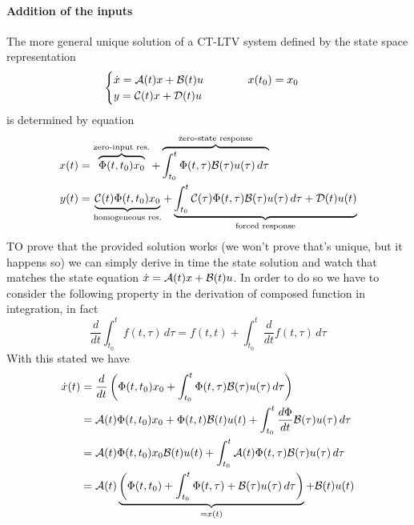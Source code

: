 	\paragraph{Addition of the inputs} The more general unique solution of a CT-LTV system defined by the state space representation
	\[ \begin{cases}
		\dot x = \mathcal{A}(t) x + \mathcal{B}(t) u \hspace{1.4cm} x(t_0) = x_0\\ 
		y = \mathcal{C}(t) x + \mathcal{D}(t) u
	\end{cases} \]
	is determined by equation
	\begin{equation}
	\begin{split}
		x(t) & = \overbrace{\Phi(t,t_0) x_0}^\textrm{zero-input res.} + \overbrace{\int_{t_0}^t \Phi(t,\tau) \mathcal{B}(\tau) u(\tau) \, d\tau}^\textrm{zero-state response} \\
		y(t) & = \underbrace{\mathcal{C}(t) \Phi(t,t_0) x_0}_\textrm{homogeneous res.} + \underbrace{ \int_{t_0}^t \mathcal{C}(\tau) \Phi(t,\tau) \mathcal{B}(\tau) u(\tau)\, d\tau + \mathcal{D}(t) u(t) }_\textrm{forced response}
	\end{split}
	\end{equation}
	TO prove that the provided solution works (we won't prove that's unique, but it happens so) we can simply derive in time the state solution and watch that matches the state equation $\dot x = \mathcal{A}(t) x + \mathcal{B}(t) u$. In order to do so we have to consider the following property in the derivation of composed function in integration, in fact
	\[ \frac{d}{dt} \int_{t_0}^t f(t,\tau)\, d\tau = f(t,t) + \int_{t_0}^t \frac{d}{dt}f(t,\tau)\, d\tau \]
	With this stated we have
	\begin{align*}
		\dot x(t) & = \frac{d}{dt} \left( \Phi(t,t_0) x_0 + \int_{t_0}^t \Phi(t,\tau) \mathcal{B}(\tau) u(\tau) \, d\tau \right) \\
		& = \mathcal{A}(t) \Phi(t,t_0) x_0 + \Phi(t,t) \mathcal{B}(t)u(t) + \int_{t_0}^t \frac{d\Phi}{dt} \mathcal{B}(\tau) u(\tau)\, d\tau \\
		& = \mathcal{A}(t)\Phi(t,t_0) x_0 \mathcal{B}(t) u(t) +  \int_{t_0}^t \mathcal{A}(t) \Phi(t,\tau) \mathcal{B}(\tau) u(\tau)\, d\tau \\
		& = \mathcal{A}(t) \underbrace{\left( \Phi(t,t_0) + \int_{t_0}^t \Phi(t,\tau) + \mathcal{B}(\tau) u(\tau)\, d\tau \right)}_{=x(t)} + \mathcal{B}(t)u(t)
	\end{align*}
	
